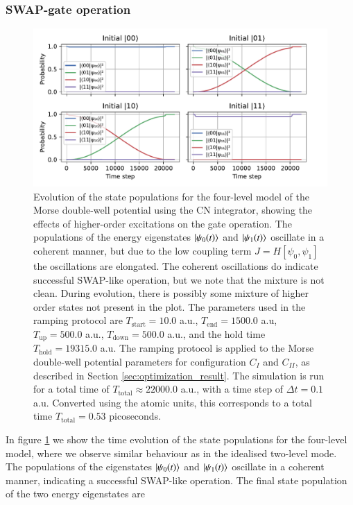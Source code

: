 \documentclass{subfiles}
\begin{document}
\subsubsection*{SWAP-gate operation}
\begin{figure}[h!]
    \centering
    \includegraphics[width=1.0\textwidth]{figs/time_evolution_4_basefunctions_2306_SWAP.pdf}
    \caption{Evolution of the state populations for the four-level model of the Morse double-well potential using the CN integrator, showing the effects of higher-order excitations on the gate operation. The populations of the energy eigenstates $\ket{\psi_0(t)}$ and $\ket{\psi_1(t)}$ oscillate in a coherent manner, but due to the low coupling term $J=H[\psi_0, \psi_1]$ the oscillations are elongated. The coherent oscillations do indicate successful SWAP-like operation, but we note that the mixture is not clean. During evolution, there is possibly some mixture of higher order states not present in the plot.
    The parameters used in the ramping protocol are $T_{\text{start}} = 10.0$ a.u., $T_{\text{end}} = 1500.0$ a.u, $T_{\text{up}} = 500.0$ a.u., $T_{\text{down}} = 500.0$ a.u., and the hold time $T_{\text{hold}} = 19 315.0$ a.u. The ramping protocol is applied to the Morse double-well potential parameters for configuration $C_I$ and $C_{II}$, as described in Section \ref{sec:optimization_result}. The simulation is run for a total time of $T_{\text{total}} \approx 22 000.0$ a.u., with a time step of $\Delta t = 0.1$ a.u. Converted using the atomic units, this corresponds to a total time $T_{\text{total}}=0.53$ picoseconds. 
    }
    \label{fig:time_evolution_4_basefunctions}
\end{figure}
In figure \ref{fig:time_evolution_4_basefunctions} we show the time evolution of the state populations for the four-level model, where we observe similar behaviour as in the idealised two-level mode. The populations of the eigenstates $\ket{\psi_0(t)}$ and $\ket{\psi_1(t)}$ oscillate in a coherent manner, indicating a successful SWAP-like operation. The final state population of the two energy eigenstates are
\end{document}
